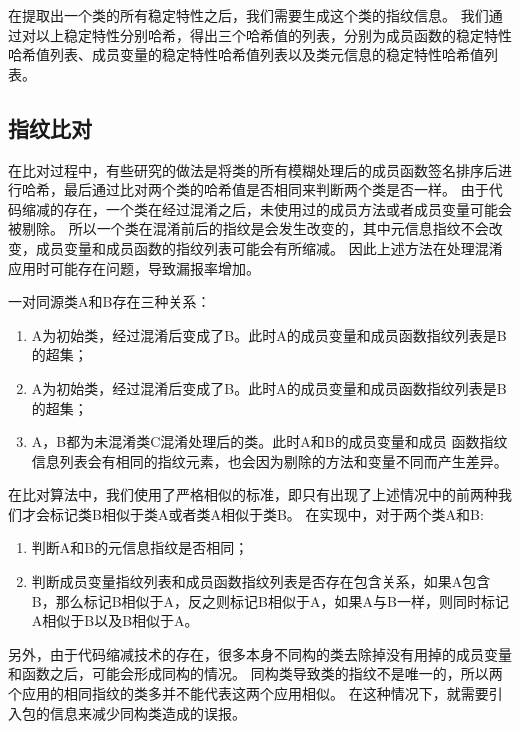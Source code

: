 在提取出一个类的所有稳定特性之后，我们需要生成这个类的指纹信息。
我们通过对以上稳定特性分别哈希，得出三个哈希值的列表，分别为成员函数的稳定特性哈希值列表、成员变量的稳定特性哈希值列表以及类元信息的稳定特性哈希值列表。

\subsection{指纹比对}

在比对过程中，有些研究的做法是将类的所有模糊处理后的成员函数签名排序后进行哈希，最后通过比对两个类的哈希值是否相同来判断两个类是否一样。
由于代码缩减的存在，一个类在经过混淆之后，未使用过的成员方法或者成员变量可能会被剔除。
所以一个类在混淆前后的指纹是会发生改变的，其中元信息指纹不会改变，成员变量和成员函数的指纹列表可能会有所缩减。
因此上述方法在处理混淆应用时可能存在问题，导致漏报率增加。

一对同源类A和B存在三种关系：

\begin{enumerate}
	\item A为初始类，经过混淆后变成了B。此时A的成员变量和成员函数指纹列表是B的超集；
	\item A为初始类，经过混淆后变成了B。此时A的成员变量和成员函数指纹列表是B的超集；
	\item A，B都为未混淆类C混淆处理后的类。此时A和B的成员变量和成员	函数指纹信息列表会有相同的指纹元素，也会因为剔除的方法和变量不同而产生差异。
\end{enumerate}

在比对算法中，我们使用了严格相似的标准，即只有出现了上述情况中的前两种我们才会标记类B相似于类A或者类A相似于类B。
在实现中，对于两个类A和B:

\begin{enumerate}
	\item 判断A和B的元信息指纹是否相同；
	\item 判断成员变量指纹列表和成员函数指纹列表是否存在包含关系，如果A包含B，那么标记B相似于A，反之则标记B相似于A，如果A与B一样，则同时标记A相似于B以及B相似于A。
\end{enumerate}

另外，由于代码缩减技术的存在，很多本身不同构的类去除掉没有用掉的成员变量和函数之后，可能会形成同构的情况。
同构类导致类的指纹不是唯一的，所以两个应用的相同指纹的类多并不能代表这两个应用相似。
在这种情况下，就需要引入包的信息来减少同构类造成的误报。

